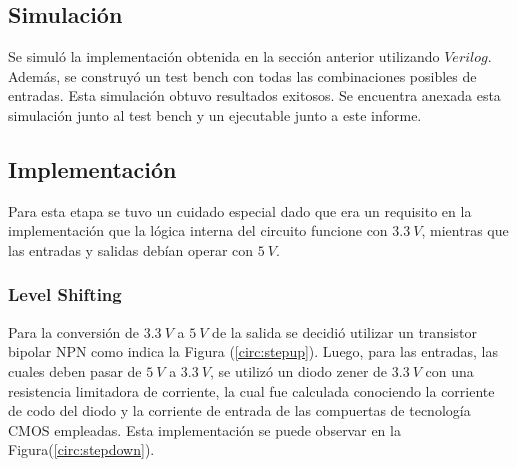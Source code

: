 \subsection{Simulación}

Se simuló la implementación obtenida en la sección anterior utilizando $Verilog$. Además, se construyó un test bench con todas las combinaciones posibles de entradas. Esta simulación obtuvo resultados exitosos. Se encuentra anexada esta simulación junto al test bench y un ejecutable junto a este informe.

\subsection{Implementación}
Para esta etapa se tuvo un cuidado especial dado que era un requisito en la implementación que la lógica interna del circuito funcione con $3.3 \ V$, mientras que las entradas y salidas debían operar con $5 \ V$.

\subsubsection{Level Shifting}
Para la conversión de $3.3 \ V$ a $5 \ V$ de la salida se decidió utilizar un transistor bipolar NPN como indica la Figura (\ref{circ:stepup}). Luego, para las entradas, las cuales deben pasar de $5 \ V$ a $3.3 \ V	$, se utilizó un diodo zener de $3.3 \ V$ con una resistencia limitadora de corriente, la cual fue calculada conociendo la corriente de codo del diodo y la corriente de entrada de las compuertas de tecnología CMOS empleadas. Esta implementación se puede observar en la Figura(\ref{circ:stepdown}). 

